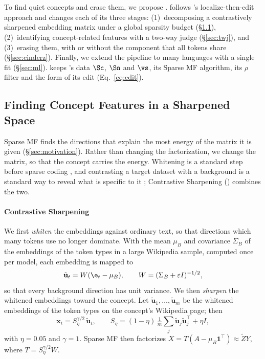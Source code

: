 \section{\cinder{}}
\label{sec:method}

To find quiet concepts and erase them, we propose \cinder{}.
\cinder{} follows \ember{}'s localize-then-edit approach and changes each of its three stages: (1)~decomposing a contrastively sharpened embedding matrix under a global sparsity budget (\S\ref{sec:cs}), (2)~identifying concept-related features with a two-way judge (\S\ref{sec:twj}), and (3)~erasing them, with or without the component that all tokens share (\S\ref{sec:cinderz}).
Finally, we extend the pipeline to many languages with a single fit (\S\ref{sec:ml}).
\cinder{} keeps \ember{}'s data $\Sc$, $\Sn$ and $\vs$, its Sparse MF algorithm, its $\rho$ filter and the form of its edit (Eq.~\ref{eq:edit}).

\subsection{Finding Concept Features in a Sharpened Space}
\label{sec:cs}

Sparse MF finds the directions that explain the most energy of the matrix it is given (\S\ref{sec:motivation}).
Rather than changing the factorization, we change the matrix, so that the concept carries the energy.
Whitening is a standard step before sparse coding \citep{hyvarinen2000ica}, and contrasting a target dataset with a background is a standard way to reveal what is specific to it \citep{abid2018exploring}; Contrastive Sharpening (\cs{}) combines the two.

\paragraph{Contrastive Sharpening}
We first \emph{whiten} the embeddings against ordinary text, so that directions which many tokens use no longer dominate.
With the mean $\mu_B$ and covariance $\Sigma_B$ of the embeddings of the token types in a large Wikipedia sample, computed once per model, each embedding is mapped to
\begin{equation}
  \tilde{\mathbf{u}}_t = W(\e_t - \mu_B), \qquad W = (\Sigma_B + \varepsilon I)^{-1/2},
  \label{eq:whiten}
\end{equation}
so that every background direction has unit variance.
We then \emph{sharpen} the whitened embeddings toward the concept.
Let $\tilde{\mathbf u}_1,\dots,\tilde{\mathbf u}_m$ be the whitened embeddings of the token types on the concept's Wikipedia page; then
\begin{equation}
  \mathbf{x}_t = S_\eta^{\gamma/2}\,\tilde{\mathbf u}_t, \qquad
  S_\eta = (1-\eta)\,\tfrac{1}{m}\textstyle\sum_{j} \tilde{\mathbf u}_j \tilde{\mathbf u}_j^{\top} + \eta I ,
  \label{eq:sharpen}
\end{equation}
with $\eta = 0.05$ and $\gamma = 1$.
Sparse MF then factorizes $X = T(A - \mu_B\mathbf 1^{\top}) \approx \tilde Z Y$, where $T = S_\eta^{\gamma/2} W$.

